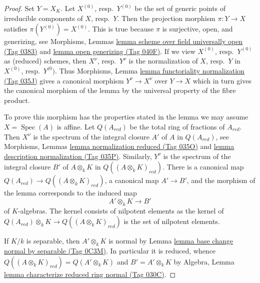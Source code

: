 \documentclass{amsart}
\theoremstyle{plain}
\theoremstyle{definition}
\theoremstyle{remark}
\numberwithin{equation}{subsection}
\def\Spec{\mathop{\mathrm{Spec}}}
\begin{document}
\begin{proof}
Set $Y = X_K$. Let $X^{(0)}$, resp.\ $Y^{(0)}$ be the set of generic points
of irreducible components of $X$, resp.\ $Y$. Then the projection morphism
$\pi : Y \to X$ satisfies $\pi(Y^{(0)}) = X^{(0)}$. This is true because
$\pi$ is surjective, open, and generizing, see
Morphisms, Lemmas \href{https://stacks.math.columbia.edu/tag/0383}{lemma scheme over field universally open (Tag 0383)} and
\href{https://stacks.math.columbia.edu/tag/040F}{lemma open generizing (Tag 040F)}.
If we view $X^{(0)}$, resp.\ $Y^{(0)}$ as (reduced) schemes, then
$X^\nu$, resp.\ $Y^\nu$ is the normalization of $X$, resp.\ $Y$ in
$X^{(0)}$, resp.\ $Y^{(0})$.
Thus Morphisms, Lemma \href{https://stacks.math.columbia.edu/tag/035J}{lemma functoriality normalization (Tag 035J)}
gives a canonical morphism $Y^\nu \to X^\nu$ over $Y \to X$ which in
turn gives the canonical morphism of the lemma by the universal
property of the fibre product.

\medskip\noindent
To prove this morphism has the properties stated in the lemma we may
assume $X = \Spec(A)$ is affine. Let $Q(A_{red})$ be the
total ring of fractions of $A_{red}$. Then $X^\nu$ is the spectrum of
the integral closure $A'$ of $A$ in $Q(A_{red})$, see
Morphisms, Lemmas \href{https://stacks.math.columbia.edu/tag/035O}{lemma normalization reduced (Tag 035O)} and
\href{https://stacks.math.columbia.edu/tag/035P}{lemma description normalization (Tag 035P)}.
Similarly, $Y^\nu$ is the spectrum of the integral closure $B'$ of
$A \otimes_k K$ in $Q((A \otimes_k K)_{red})$. There is a canonical
map $Q(A_{red}) \to Q((A \otimes_k K)_{red})$, a canonical map
$A' \to B'$, and the morphism of the lemma corresponds to the induced map
$$
A' \otimes_k K \longrightarrow B'
$$
of $K$-algebras. The kernel consists of nilpotent
elements as the kernel of $Q(A_{red}) \otimes_k K \to Q((A \otimes_k K)_{red})$
is the set of nilpotent elements.

\medskip\noindent
If $K/k$ is separable, then $A' \otimes_k K$ is normal by
Lemma \href{https://stacks.math.columbia.edu/tag/0C3M}{lemma base change normal by separable (Tag 0C3M)}. In particular
it is reduced, whence $Q((A \otimes_k K)_{red}) = Q(A' \otimes_k K)$
and $B' = A' \otimes_k K$ by
Algebra, Lemma \href{https://stacks.math.columbia.edu/tag/030C}{lemma characterize reduced ring normal (Tag 030C)}.


\end{proof}
\end{document}
